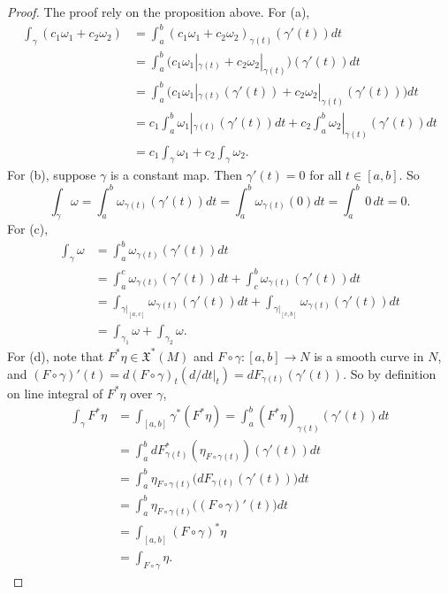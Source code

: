 \documentclass[a4paper]{article}
\theoremstyle{remark}
\newcommand{\VF}{\mathfrak{X}} %
\begin{document}
\begin{proof}
The proof rely on the proposition above. For (a),
\begin{align*}
\int_{\gamma} (c_1 \omega_1 + c_2 \omega_2) &= \int_a^b (c_1 \omega_1 + c_2 \omega_2)_{\gamma(t)} (\gamma'(t)) dt \\ &= \int_a^b \Big(c_1 \omega_1|_{\gamma(t)} + c_2 \omega_2|_{\gamma(t)} \Big)  (\gamma'(t)) dt \\ &= \int_a^b \Big(c_1 \omega_1|_{\gamma(t)} (\gamma'(t)) + c_2  \omega_2|_{\gamma(t)} (\gamma'(t)) \Big) dt \\
&= c_1 \int_a^b \omega_1|_{\gamma(t)} (\gamma'(t)) dt + c_2 \int_a^b \omega_2|_{\gamma(t)} (\gamma'(t)) dt \\ &=
  c_1 \int_{\gamma} \omega_1 + c_2 \int_{\gamma} \omega_2.
\end{align*}
For (b), suppose $\gamma$ is a constant map. Then $\gamma'(t) = 0$ for all $t \in [a,b]$. So
$$
\int_{\gamma} \omega = \int_a^b \omega_{\gamma(t)} (\gamma'(t)) dt = \int_a^b \omega_{\gamma(t)} (0) dt = \int_a^b \, 0\, dt = 0.
$$ 
For (c), 
\begin{align*}
\int_{\gamma} \omega  &= \int_a^b \omega_{\gamma(t)} (\gamma'(t)) dt\\  &= \int_a^c \omega_{\gamma(t)} (\gamma'(t)) dt + \int_c^b \omega_{\gamma(t)} (\gamma'(t)) dt\\ &= \int_{\gamma|_{[a,c]}} \omega_{\gamma(t)} (\gamma'(t)) dt + \int_{\gamma|_{[c,b]}} \omega_{\gamma(t)} (\gamma'(t)) dt \\ &= \int_{\gamma_1} \omega + \int_{\gamma_2} \omega.
\end{align*}
For (d), note that $F^*\eta \in \VF^*(M)$ and $F\circ \gamma :[a,b] \to N$ is a smooth curve in $N$, and $(F \circ \gamma)'(t) =d(F \circ \gamma)_t (d/dt|_t) =dF_{\gamma(t)} (\gamma'(t))$. So by definition on line integral of $F^*\eta$ over $\gamma$,
\begin{align*}
\int_{\gamma} F^*\eta &= \int_{[a,b]} \gamma^*(F^*\eta) = \int_a^b (F^*\eta)_{\gamma(t)} (\gamma'(t)) dt \\ &= \int_{a}^{b} dF^*_{\gamma(t)} (\eta_{F \circ \gamma (t)}) (\gamma'(t)) dt \\ &=  \int_a^b  \eta_{F \circ \gamma (t)} \big(dF_{\gamma(t)} (\gamma'(t))\big) dt \\
&= \int_a^b \eta_{F \circ \gamma (t)} \big((F \circ \gamma)'(t) \big) dt \\
&= \int_{[a,b]} (F \circ \gamma)^* \eta \\
&= \int_{F \circ \gamma} \eta.
\end{align*}
\end{proof}
\end{document}
